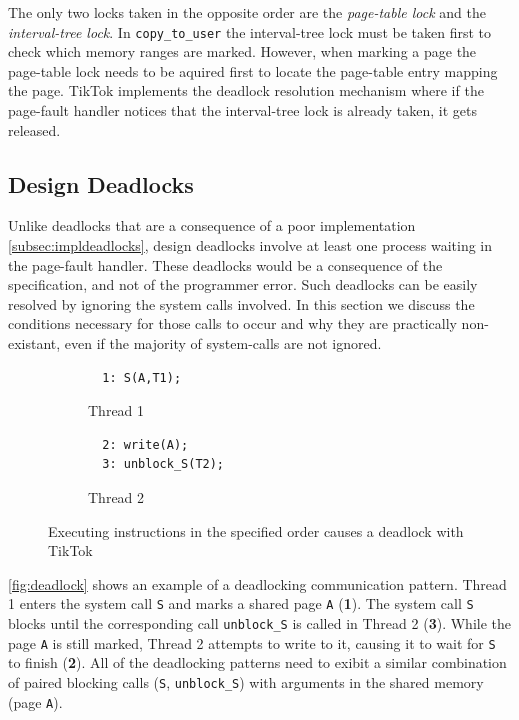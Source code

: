 \documentclass[conference]{IEEEtran}
\newcommand{\sysname}{TikTok}
\begin{document}
The only two locks taken in the opposite order are the \emph{page-table lock}
and the \emph{interval-tree lock}. In \texttt{copy\_to\_user} the interval-tree
lock must be taken first to check which memory ranges are marked. However, when
marking a page the page-table lock needs to be aquired first to locate the
page-table entry mapping the page. \sysname{} implements the deadlock resolution
mechanism where if the page-fault handler notices that the interval-tree lock is
already taken, it gets released.


\subsection{Design Deadlocks}
\label{subsec:tiktokdeadlocks}

Unlike deadlocks that are a consequence of a poor implementation
\autoref{subsec:impldeadlocks}, design deadlocks involve at least one process
waiting in the page-fault handler. These deadlocks would be a consequence of the
specification, and not of the programmer error. Such deadlocks can be easily
resolved by ignoring the system calls involved. In this section we discuss the 
conditions necessary for those calls to occur and why they are practically
non-existant, even if the majority of system-calls are not ignored.

\begin{figure}
  \centering
  \begin{subfigure}[b]{0.45\linewidth}
  \begin{minipage}{\linewidth}
  \begin{lstlisting}
  1: S(A,T1);  
  \end{lstlisting}
  \end{minipage}
  \caption{Thread 1}
  \end{subfigure}
  \hfill
  \begin{subfigure}[b]{0.45\linewidth}
  \begin{minipage}{\linewidth}
  \begin{lstlisting}
  2: write(A);
  3: unblock_S(T2);
  \end{lstlisting}  
  \end{minipage}
  \caption{Thread 2}
  \end{subfigure}
  \caption{Executing instructions in the specified order causes a deadlock with \sysname}
  \label{fig:deadlock}
\end{figure}


\autoref{fig:deadlock} shows an example of a deadlocking communication pattern.
Thread 1 enters the system call \texttt{S} and marks a shared page \texttt{A}
(\textbf{1}). The system call \texttt{S} blocks until the corresponding call
\texttt{unblock\_S} is called in Thread 2 (\textbf{3}). While the page
\texttt{A} is still marked, Thread 2 attempts to write to it, causing it to wait
for \texttt{S} to finish (\textbf{2}). All of the deadlocking patterns need to
exibit a similar combination of paired blocking calls (\texttt{S},
\texttt{unblock\_S}) with arguments in the shared memory (page \texttt{A}).
\end{document}

